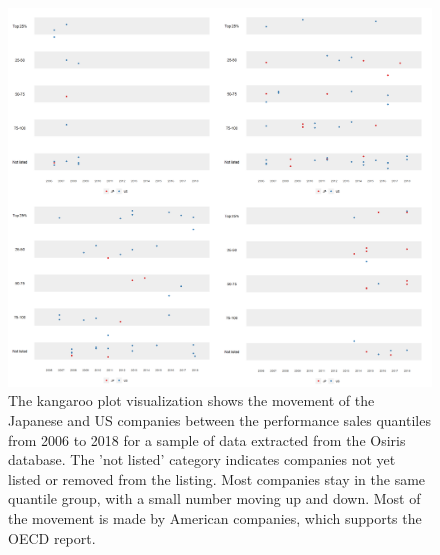 \begin{figure}

{\centering \includegraphics[width=1\linewidth]{figures/osiris} 

}

\caption{The kangaroo plot visualization shows the movement of the Japanese and US companies between the performance sales quantiles from 2006 to 2018 for a sample of data extracted from the Osiris database. The 'not listed' category indicates companies not yet listed or removed from the listing. Most companies stay in the same quantile group, with a small number moving up and down. Most of the movement is made by American companies, which supports the OECD report.}\label{fig:kan-osiris-figure}
\end{figure}

